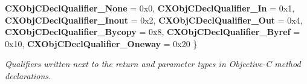 \begin{DoxyCompactItemize}
{\bfseries C\+X\+Obj\+C\+Decl\+Qualifier\+\_\+\+None} = 0x0, 
{\bfseries C\+X\+Obj\+C\+Decl\+Qualifier\+\_\+\+In} = 0x1, 
{\bfseries C\+X\+Obj\+C\+Decl\+Qualifier\+\_\+\+Inout} = 0x2, 
{\bfseries C\+X\+Obj\+C\+Decl\+Qualifier\+\_\+\+Out} = 0x4, 
\newline
{\bfseries C\+X\+Obj\+C\+Decl\+Qualifier\+\_\+\+Bycopy} = 0x8, 
{\bfseries C\+X\+Obj\+C\+Decl\+Qualifier\+\_\+\+Byref} = 0x10, 
{\bfseries C\+X\+Obj\+C\+Decl\+Qualifier\+\_\+\+Oneway} = 0x20
 \}\begin{DoxyCompactList}\small\item\em \textquotesingle{}Qualifiers\textquotesingle{} written next to the return and parameter types in Objective-\/C method declarations. \end{DoxyCompactList}
\end{DoxyCompactItemize}
